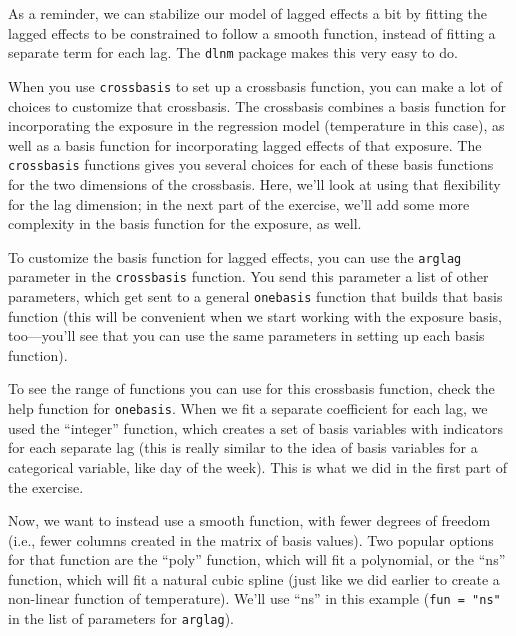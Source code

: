 \documentclass[
]{book}
\begin{document}
As a reminder, we can stabilize our model of lagged effects a bit by fitting the
lagged effects to be constrained to follow a smooth function, instead of fitting a separate
term for each lag. The \texttt{dlnm} package makes this very easy to do.

When you use \texttt{crossbasis} to set up a crossbasis function, you can make a lot of choices
to customize that crossbasis. The crossbasis combines a basis function for incorporating
the exposure in the regression model (temperature in this case), as well as a basis function
for incorporating lagged effects of that exposure. The \texttt{crossbasis} functions gives you
several choices for each of these basis functions for the two dimensions of the
crossbasis. Here, we'll look at using that flexibility for the lag dimension; in the next
part of the exercise, we'll add some more complexity in the basis function for the
exposure, as well.

To customize the basis function for lagged effects, you can use the \texttt{arglag} parameter
in the \texttt{crossbasis} function. You send this parameter a list of other parameters, which
get sent to a general \texttt{onebasis} function that builds that basis function (this will
be convenient when we start working with the exposure basis, too---you'll see that you
can use the same parameters in setting up each basis function).

To see the range of functions you can use for this crossbasis function, check the help
function for \texttt{onebasis}. When we fit a separate coefficient for each lag, we used the
``integer'' function, which creates a set of basis variables with indicators for each
separate lag (this is really similar to the idea of basis variables for a categorical
variable, like day of the week). This is what we did in the first part of the exercise.

Now, we want to instead use a smooth function, with fewer degrees of freedom (i.e., fewer
columns created in the matrix of basis values). Two popular options for that function are
the ``poly'' function, which will fit a polynomial, or the ``ns'' function, which will fit
a natural cubic spline (just like we did earlier to create a non-linear function of
temperature). We'll use ``ns'' in this example (\texttt{fun\ =\ "ns"} in the list of parameters for
\texttt{arglag}).
\end{document}
